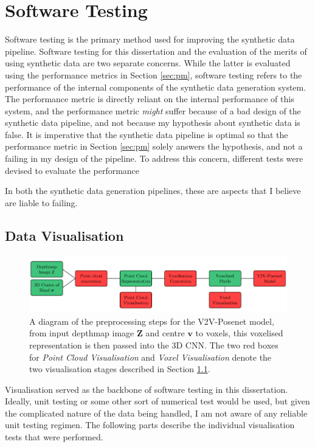 \section{Software Testing}
\label{sec:sd:st}
Software testing is the primary method used for improving the synthetic data pipeline. Software testing for this dissertation and the evaluation of the merits of using synthetic data are two separate concerns. While the latter is evaluated using the performance metrics in Section \ref{sec:pm}, software testing refers to the performance of the internal components of the synthetic data generation system. The performance metric is directly reliant on the internal performance of this system, and the performance metric {\slshape might} suffer because of a bad design of the synthetic data pipeline, and not because my hypothesis about synthetic data is false. It is imperative that the synthetic data pipeline is optimal so that the performance metric in Section \ref{sec:pm} solely answers the hypothesis, and not a failing in my design of the pipeline. To address this concern, different tests were devised to evaluate the performance

In both the synthetic data generation pipelines, these are aspects that I believe are liable to failing.

\subsection{Data Visualisation}
\label{sec:es:st:dv}
\begin{figure}
\includegraphics[width=\linewidth]{figs/general/voxelisation.pdf}
\caption{A diagram of the preprocessing steps for the V2V-Posenet model, from input depthmap image $\bm{Z}$ and centre $\bm{v}$ to voxels, this voxelised representation is then passed into the 3D CNN. The two red boxes for {\slshape Point Cloud Visualisation} and {\slshape Voxel Visualisation} denote the two visualisation stages described in Section \ref{sec:es:st:dv}.}
\label{fig:prevoxels}
\end{figure}
Visualisation served as the backbone of software testing in this dissertation. Ideally, unit testing or some other sort of numerical test would be used, but given the complicated nature of the data being handled, I am not aware of any reliable unit testing regimen. The following parts describe the individual visualisation tests that were performed.

